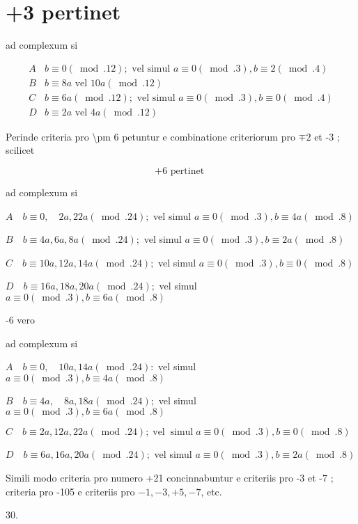 \documentclass[10pt]{article}
\begin{document}
\section*{+3 pertinet}
ad complexum si

\[
\begin{array}{l|l}
A & b \equiv 0(\bmod .12) ; \text { vel simul } a \equiv 0(\bmod .3), b \equiv 2(\bmod .4) \\
B & b \equiv 8 a \text { vel } 10 a(\bmod .12) \\
C & b \equiv 6 a(\bmod .12) ; \text { vel simul } a \equiv 0(\bmod .3), b \equiv 0(\bmod .4) \\
D & b \equiv 2 a \text { vel } 4 a(\bmod .12)
\end{array}
\]

Perinde criteria pro \textbackslash pm 6 petuntur e combinatione criteriorum pro \(\mp 2\) et -3 ; scilicet

\[
+6 \text { pertinet }
\]

ad complexum si

\(A \quad b \equiv 0, \quad 2 a, 22 a(\bmod .24) ;\) vel simul \(a \equiv 0(\bmod .3), b \equiv 4 a(\bmod .8)\)

\(B \quad b \equiv 4 a, 6 a, 8 a(\bmod .24) ;\) vel simul \(a \equiv 0(\bmod .3), b \equiv 2 a(\bmod .8)\)

\(C \quad b \equiv 10 a, 12 a, 14 a(\bmod .24) ;\) vel simul \(a \equiv 0(\bmod .3), b \equiv 0(\bmod .8)\)

\(D \quad b \equiv 16 a, 18 a, 20 a(\bmod .24) ;\) vel simul \(a \equiv 0(\bmod .3), b \equiv 6 a(\bmod .8)\)

-6 vero

ad complexum si

\(A \quad b \equiv 0, \quad 10 a, 14 a(\bmod .24):\) vel simul \(a \equiv 0(\bmod .3), b \equiv 4 a(\bmod .8)\)

\(B \quad b \equiv 4 a, \quad 8 a, 18 a(\bmod .24) ;\) vel simul \(a \equiv 0(\bmod .3), b \equiv 6 a(\bmod .8)\)

\(C \quad b \equiv 2 a, 12 a, 22 a(\bmod .24) ; \operatorname{vel} \operatorname{simul} a \equiv 0(\bmod .3), b \equiv 0(\bmod .8)\)

\(D \quad b \equiv 6 a, 16 a, 20 a(\bmod .24) ;\) vel simul \(a \equiv 0(\bmod .3), b \equiv 2 a(\bmod .8)\)

Simili modo criteria pro numero +21 concinnabuntur e criteriis pro -3 et -7 ; criteria pro -105 e criteriis pro \(-1,-3,+5,-7\), etc.

30.
\end{document}

